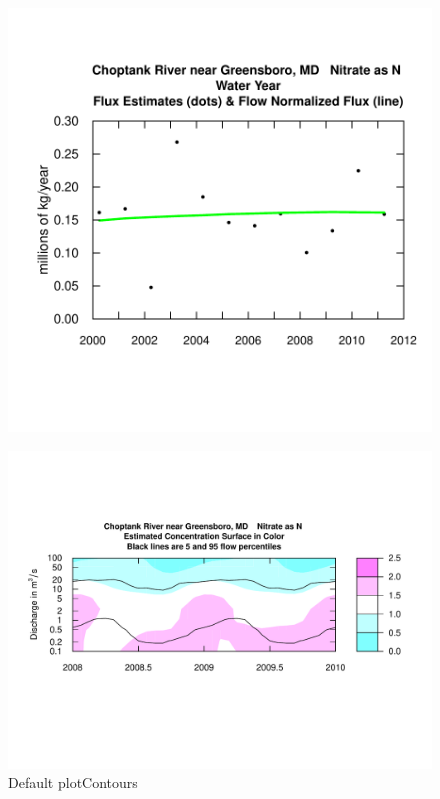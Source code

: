 \documentclass[a4paper,11pt]{article}
\begin{document}
\begin{figure}[htbp]
\begin{minipage}[h]{0.5\linewidth}
\begin{center}
\includegraphics{EGRET-figplotFluxHist}
    \label{fig:plotFluxHist}
    \end{center}
  \end{minipage}
  \caption{}
  \label{fig:plotConcHistANDplotFluxHist}
\end{figure}


\begin{figure}[ht]
\begin{center}

\includegraphics{EGRET-figplotContours}
\end{center}
\caption{Default plotContours}
\label{fig:plotContours}
\end{figure}
\end{document}
